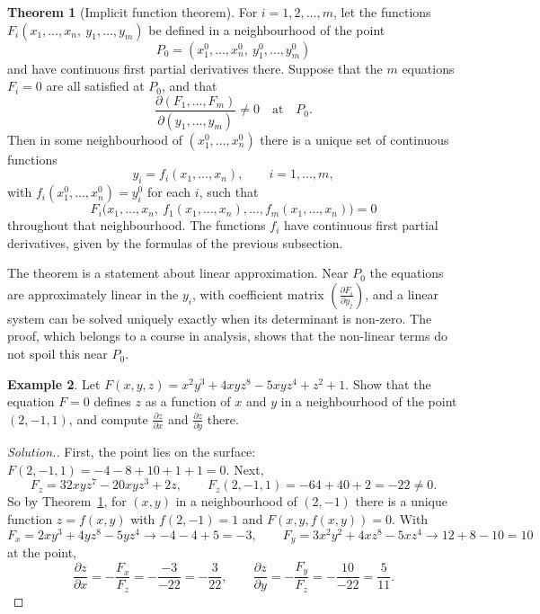\documentclass[11pt,a4paper]{article}
\theoremstyle{definition}
\newtheorem{thm}{Theorem}[subsection]
\newtheorem{exa}[thm]{Example}
\newenvironment{solution}
  {\renewcommand{\qedsymbol}{}\begin{proof}[\textit{Solution}.]}
  {\end{proof}}
\begin{document}
\begin{thm}[Implicit function theorem]
\label{thm:ift}
For $i = 1,2,\dots , m$, let the functions
$F_i(x_1,\dots ,x_n,\ y_1,\dots ,y_m)$ be defined in a neighbourhood of the point
\[P_0 = (x_1^0,\dots ,x_n^0,\ y_1^0,\dots , y_m^0)\]
and have continuous first partial derivatives there. Suppose that the $m$
equations $F_i = 0$ are all satisfied at $P_0$, and that
\[\frac{\partial(F_1,\dots ,F_m)}{\partial(y_1,\dots ,y_m)} \neq 0 \quad
\text{at}\quad  P_0 .\]
Then in some neighbourhood of $(x^0_1,\dots , x^0_n)$ there is a unique set of
continuous functions
\[y_i = f_i (x_1, \dots ,x_n), \qquad  i = 1,\dots , m,\]
with $f_i (x^0_1,\dots ,x^0_n) = y_i^0$ for each $i$, such that
\[F_i\big(x_1,\dots , x_n,\ f_1(x_1,\dots ,x_n),\dots , f_m(x_1,\dots
,x_n)\big) = 0\]
throughout that neighbourhood. The functions $f_i$ have continuous first
partial derivatives, given by the formulas of the previous subsection.
\end{thm}

The theorem is a statement about linear approximation. Near $P_0$ the equations
are approximately linear in the $y_i$, with coefficient matrix
$\left(\frac{\partial F_i}{\partial y_j}\right)$, and a linear system can be
solved uniquely exactly when its determinant is non-zero. The proof, which
belongs to a course in analysis, shows that the non-linear terms do not spoil
this near $P_0$.

\begin{exa}
\label{ex:ift}
Let $F(x,y,z) = x^2y^3 + 4xyz^8 - 5xyz^4 + z^2 + 1$. Show that the equation
$F = 0$ defines $z$ as a function of $x$ and $y$ in a neighbourhood of the point
$(2,-1,1)$, and compute $\frac{\partial z}{\partial x}$ and
$\frac{\partial z}{\partial y}$ there.
\end{exa}

\begin{solution}
First, the point lies on the surface:
$F(2,-1,1) = -4 - 8 + 10 + 1 + 1 = 0$. Next,
\[F_z = 32xyz^7 - 20xyz^3 + 2z,\qquad F_z(2,-1,1) = -64 + 40 + 2 = -22 \neq 0 .\]
So by Theorem~\ref{thm:ift}, for $(x,y)$ in a neighbourhood of $(2,-1)$ there is
a unique function $z = f(x,y)$ with $f(2,-1) = 1$ and $F(x,y,f(x,y)) = 0$. With
\[F_x = 2xy^3 + 4yz^8 - 5yz^4 \to -4 - 4 + 5 = -3,\qquad F_y = 3x^2y^2 + 4xz^8 -
5xz^4 \to 12 + 8 - 10 = 10\]
at the point,
\[\frac{\partial z}{\partial x} = -\frac{F_x}{F_z} = -\frac{-3}{-22} =
-\frac{3}{22},\qquad \frac{\partial z}{\partial y} = -\frac{F_y}{F_z} =
-\frac{10}{-22} = \frac{5}{11} .\]
\end{solution}
\end{document}

